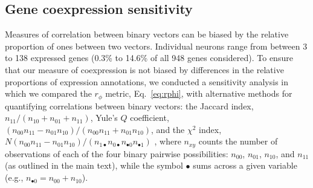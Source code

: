 \documentclass[10pt,letterpaper]{article}
\begin{document}
{\subsection*{Gene coexpression sensitivity}

Measures of correlation between binary vectors can be biased by the relative proportion of ones between two vectors.
Individual neurons range from between 3 to 138 expressed genes (0.3\% to 14.6\% of all 948 genes considered).
To ensure that our measure of coexpression is not biased by differences in the relative proportions of expression annotations, we conducted a sensitivity analysis in which we compared the $r_\phi$ metric, Eq.~\eqref{eq:rphi}, with alternative methods for quantifying correlations between binary vectors: the
Jaccard index, $n_{11}/(n_{10}+n_{01}+n_{11})$,
Yule's $Q$ coefficient, $(n_{00}n_{11} - n_{01}n_{10})/(n_{00}n_{11} + n_{01}n_{10})$,
and the $\chi^2$ index, $N (n_{00}n_{11} - n_{01}n_{10})/(n_{1\bullet}n_{0\bullet}n_{\bullet 0}n_{\bullet 1})$ \cite{Kaufman2006}, where $n_{xy}$ counts the number of observations of each of the four binary pairwise possibilities: $n_{00}$, $n_{01}$, $n_{10}$, and $n_{11}$ (as outlined in the main text), while the symbol $\bullet$ sums across a given variable (e.g., $n_{\bullet 0} = n_{00} + n_{10}$).

}
\end{document}
